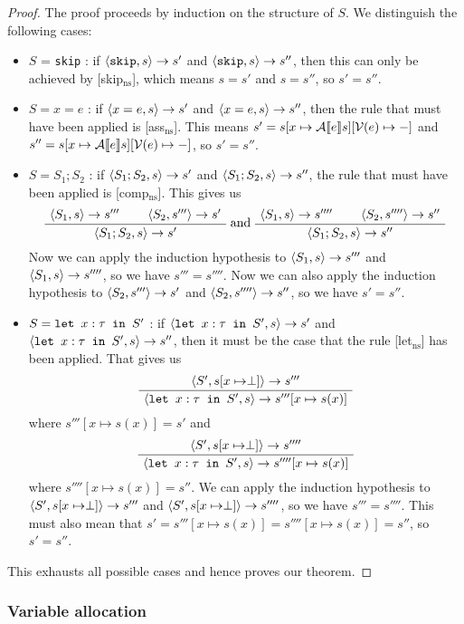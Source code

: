 \begin{proof}
The proof proceeds by induction on the structure of $S$. We distinguish the following cases:
\begin{itemize}[noitemsep]
    \item $S$ = \texttt{skip} : if $\langle \texttt{skip}, s \rangle \to s'$ and $\langle \texttt{skip}, s \rangle \to s''$, then this can only be achieved by [skip$_{\textrm{ns}}$], which means $s=s'$ and $s=s''$, so $s' = s''$. 
    \item $S = x = e$ : if $\langle x = e, s \rangle \to s'$ and $\langle x = e, s \rangle \to s''$, then the rule that must have been applied is [ass$_{\textrm{ns}}$]. This means $s'= s[x \mapsto \mathcal{A} \llbracket e \rrbracket s][\mathcal{V}(e)\mapsto-]$ and $s''=s[x \mapsto \mathcal{A} \llbracket e \rrbracket s][\mathcal{V}(e)\mapsto-]$, so $s'=s''$.
    \item $S = S_1; S_2$ : if $\langle S_1;S_2, s \rangle \to s'$ and $\langle S_1;S_2, s \rangle \to s''$, the rule that must have been applied is [comp$_{\textrm{ns}}$]. This gives us
    $$  \AxiomC{$\ns{S_1}{s}{s'''}$}
\AxiomC{$\ns{S_2}{s'''}{s'}$}
\BinaryInfC{$\ns{S_1; S_2}{s}{s'}$}
\DisplayProof
 \textrm{ and }
 \AxiomC{$\ns{S_1}{s}{s''''}$}
\AxiomC{$\ns{S_2}{s''''}{s''}$}
\BinaryInfC{$\ns{S_1; S_2}{s}{s''}$}
\DisplayProof$$
    Now we can apply the induction hypothesis to $\langle S_1, s \rangle \to s'''$ and $\langle S_1, s \rangle \to s''''$, so we have $s''' = s''''$. Now we can also apply the induction hypothesis to $\langle S_2, s''' \rangle \to s'$ and $\langle S_2, s'''' \rangle \to s''$, so we have $s' = s''$.
    \item $S = \texttt{let }x : \tau \texttt{ in } S'$ : if $\langle \texttt{let }x : \tau \texttt{ in } S', s \rangle \to s'$ and $\langle \texttt{let }x : \tau \texttt{ in } S', s \rangle \to s''$, then it must be the case that the rule [let$_{\textrm{ns}}$] has been applied. That gives us
    $$
    \AxiomC{$\ns{S'}{s[x\mapsto \perp]}{s'''}$}
\UnaryInfC{$\ns{\letm{x}{S'}}{s}{s'''[x \mapsto s(x)]}$}
\DisplayProof
    $$
    where $s'''[x \mapsto s(x)] = s'$ and
    $$\AxiomC{$\ns{S'}{s[x\mapsto \perp]}{s''''}$}
\UnaryInfC{$\ns{\letm{x}{S'}}{s}{s''''[x \mapsto s(x)]}$}
\DisplayProof
    $$
    where $s''''[x \mapsto s(x)] = s''$. 
    We can apply the induction hypothesis to $\langle S', s[x\mapsto \perp] \rangle \to s'''$ and $\langle S', s[x\mapsto \perp] \rangle \to s''''$, so we have $s''' = s''''$. This must also mean that $s' = s'''[x \mapsto s(x)] = s''''[x \mapsto s(x)] = s''$, so $s' = s''$.
\end{itemize}
This exhausts all possible cases and hence proves our theorem. 
\end{proof}

\subsubsection*{Variable allocation}

